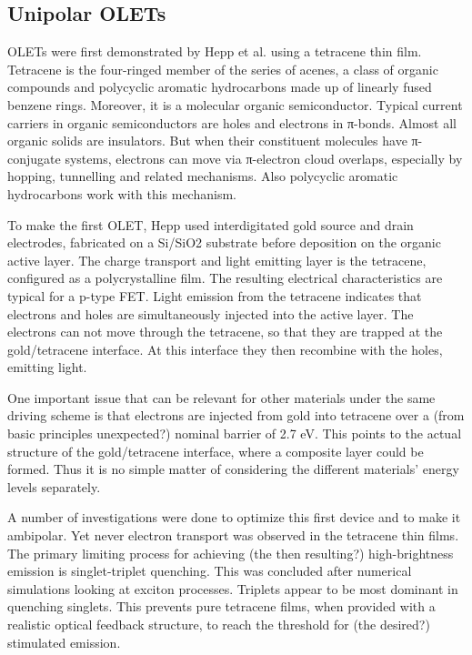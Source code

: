 \subsection{Unipolar OLETs} %

OLETs were first demonstrated by Hepp et al. using a tetracene thin film. Tetracene is the four-ringed member of the series of acenes, a class of organic compounds and polycyclic aromatic hydrocarbons made up of linearly fused benzene rings. Moreover, it is a molecular organic semiconductor. Typical current carriers in organic semiconductors are holes and electrons in π-bonds. Almost all organic solids are insulators. But when their constituent molecules have π-conjugate systems, electrons can move via π-electron cloud overlaps, especially by hopping, tunnelling and related mechanisms. Also polycyclic aromatic hydrocarbons work with this mechanism.

To make the first OLET, Hepp used interdigitated gold source and drain electrodes, fabricated on a Si/SiO2 substrate before deposition on the organic active layer. The charge transport and light emitting layer is the tetracene, configured as a polycrystalline film. The resulting electrical characteristics are typical for a p-type FET. Light emission from the tetracene indicates that electrons and holes are simultaneously injected into the active layer. The electrons can not move through the tetracene, so that they are trapped at the gold/tetracene interface. At this interface they then recombine with the holes, emitting light.

One important issue that can be relevant for other materials under the same driving scheme is that electrons are injected from gold into tetracene over a (from basic principles unexpected?) nominal barrier of 2.7 eV. This points to the actual structure of the gold/tetracene interface, where a composite layer could be formed. Thus it is no simple matter of considering the different materials' energy levels separately. 

A number of investigations were done to optimize this first device and to make it ambipolar. Yet never electron transport was observed in the tetracene thin films. The primary limiting process for achieving (the then resulting?) high-brightness emission is singlet-triplet quenching. This was concluded after numerical simulations looking at exciton processes. Triplets appear to be most dominant in quenching singlets. This prevents pure tetracene films, when provided with a realistic optical feedback structure, to reach the threshold for (the desired?) stimulated emission.

